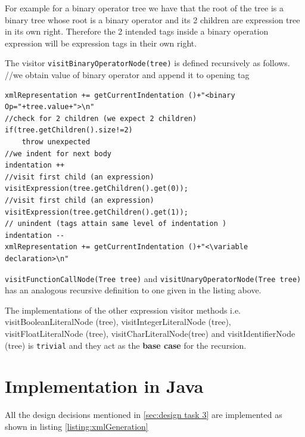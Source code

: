 For example for a binary operator tree we have that the root of the tree is a binary tree whose root is a binary operator and its 2 children are expression tree in its own right. Therefore the 2 intended tags inside a binary operation expression will be expression tags in their own right.

The visitor \verb!visitBinaryOperatorNode(tree)! is defined recursively as follows.
//we obtain value of binary operator and append it to opening tag
\begin{lstlisting}[caption=PSEUDOCODE for visitBinaryOperatorNode(Tree tree)]
xmlRepresentation += getCurrentIndentation ()+"<binary Op="+tree.value+">\n"
//check for 2 children (we expect 2 children)
if(tree.getChildren().size!=2) 
    throw unexpected
//we indent for next body 
indentation ++
//visit first child (an expression)
visitExpression(tree.getChildren().get(0));
//visit first child (an expression)
visitExpression(tree.getChildren().get(1));
// unindent (tags attain same level of indentation )
indentation --
xmlRepresentation += getCurrentIndentation ()+"<\variable declaration>\n"
\end{lstlisting}


\verb!visitFunctionCallNode(Tree tree)! and \verb!visitUnaryOperatorNode(Tree tree)! has an analogous recursive definition to one given in the listing above.

The implementations of the other expression visitor methods i.e. visitBooleanLiteralNode (tree), visitIntegerLiteralNode (tree), visitFloatLiteralNode (tree), visitCharLiteralNode(tree) and visitIdentifierNode (tree) is \verb!trivial! and they act as the \textbf{base case} for the recursion.




\section{Implementation in Java}
All the design decisions mentioned in \ref{sec:design task 3} are implemented as shown in listing \ref{listing:xmlGeneration}
